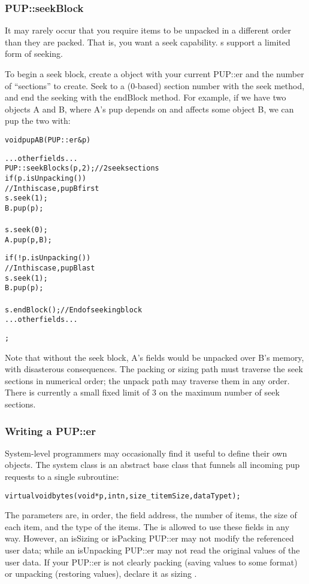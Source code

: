 \subsubsection{PUP::seekBlock}
It may rarely occur that you require items to be unpacked
in a different order than they are packed.  That is, you
want a seek capability.  s support a limited 
form of seeking.

To begin a seek block, create a  object
with your current PUP::er and the number of ``sections'' to 
create.  Seek to a (0-based) section number
with the seek method, and end the seeking with the endBlock method.
For example, if we have two objects A and B, where A's pup
depends on and affects some object B, we can pup the two with:

\begin{alltt}
void pupAB(PUP::er &p)
{
  ... other fields ...
  PUP::seekBlock s(p,2); //2 seek sections
  if (p.isUnpacking()) 
  {//In this case, pup B first
    s.seek(1);
    B.pup(p);
  }
  s.seek(0);
  A.pup(p,B);
  
  if (!p.isUnpacking()) 
  {//In this case, pup B last
    s.seek(1);
    B.pup(p);
  }
  s.endBlock(); //End of seeking block
  ... other fields ...
};
\end{alltt}

Note that without the seek block, A's fields would be unpacked
over B's memory, with disasterous consequences.
The packing or sizing path must traverse the seek sections
in numerical order; the unpack path may traverse them in any
order.  There is currently a small fixed limit of 3 on the 
maximum number of seek sections.


\subsubsection{Writing a PUP::er}
System-level programmers may occasionally find it useful to define
their own  objects.  The system  class is 
an abstract base class that funnels all incoming pup requests
to a single subroutine:

\begin{alltt}
    virtual void bytes(void *p,int n,size\_t itemSize,dataType t);
\end{alltt}

The parameters are, in order, the field address, the number of items,
the size of each item, and the type of the items. The 
is allowed to use these fields in any way.  However, an isSizing
or isPacking PUP::er may not modify the referenced user data; 
while an isUnpacking PUP::er may not read the original values of 
the user data.  If your PUP::er is not clearly packing (saving values
to some format) or unpacking (restoring values), declare it as 
sizing .



